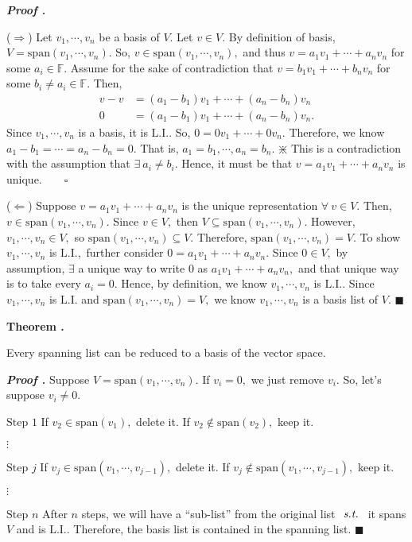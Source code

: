 \documentclass[11pt, letterpaper]{article}
\newcounter{index}[subsection]
\newenvironment*{thm}[1]{\begin{tcolorbox}\par\noindent\textbf{Theorem \thesubsection.\stepcounter{index}\theindex\ #1} \par}{\par\end{tcolorbox}}
\newcounter{nprf}[subsection]
\newenvironment*{prf}{\par\indent\textbf{\textit{Proof \stepcounter{nprf}\thenprf.}}}{\hfill$\blacksquare$\par}
\def\F{\mathbb{F}}
\def\st{\emph{ s.t. }}
\def\LI{\mathrm{L.I.}}
\def\span{\mathrm{span}}
\begin{document}
\begin{prf}
	\par ($\Rightarrow$) Let $v_1,\cdots,v_n$ be a basis of $V$. Let $v\in V.$ By definition of basis, $V=\span(v_1,\cdots,v_n).$ So, $v\in\span(v_1,\cdots,v_n),$ and thus $v=a_1v_1+\cdots+a_nv_n$ for some $a_i\in\F.$ Assume for the sake of contradiction that $v=b_1v_1+\cdots+b_nv_n$ for some $b_i\neq a_i\in\F.$ Then, \[\begin{aligned}v-v&=(a_1-b_1)v_1+\cdots+(a_n-b_n)v_n\\0&=(a_1-b_1)v_1+\cdots+(a_n-b_n)v_n.\end{aligned}\] Since $v_1,\cdots,v_n$ is a basis, it is $\LI.$ So, $0=0v_1+\cdots+0v_n.$ Therefore, we know $a_1-b_1=\cdots=a_n-b_n=0.$ That is, $a_1=b_1,\cdots,a_n=b_n.$ $\divideontimes$ This is a contradiction with the assumption that $\exists\ a_i\neq b_i.$ Hence, it must be that $v=a_1v_1+\cdots+a_nv_n$ is unique.$\qquad\square$\par 
	($\Leftarrow$) Suppose $v=a_1v_1+\cdots+a_nv_n$ is the unique representation $\forall\ v\in V.$ Then, $v\in\span(v_1,\cdots,v_n).$ Since $v\in V,$ then $V\subseteq\span(v_1,\cdots,v_n).$ However, $v_1,\cdots,v_n\in V,$ so $\span(v_1,\cdots,v_n)\subseteq V.$ Therefore, $\span(v_1,\cdots,v_n)=V.$ To show $v_1,\cdots,v_n$ is $\LI,$ further consider $0=a_1v_1+\cdots+a_nv_n.$ Since $0\in V,$ by assumption, $\exists$ a unique way to write $0$ as $a_1v_1+\cdots+a_nv_n,$ and that unique way is to take every $a_i=0.$ Hence, by definition, we know $v_1,\cdots,v_n$ is $\LI$. Since $v_1,\cdots,v_n$ is $\LI$ and $\span(v_1,\cdots,v_n)=V,$ we know $v_1,\cdots,v_n$ is a basis list of $V$.
\end{prf}
\begin{thm}{}
	Every spanning list can be reduced to a basis of the vector space. 	
\end{thm}
\begin{prf}
	Suppose $V=\span(v_1,\cdots,v_n).$ If $v_i=0,$ we just remove $v_i.$ So, let's suppose $v_i\neq0.$\par 
	$\boxed{\text{Step }1}$ If $v_2\in\span(v_1),$ delete it. If $v_2\notin\span(v_2),$ keep it.\par\indent\indent$\vdots$\par 
	$\boxed{\text{Step }j}$ If $v_j\in\span(v_1,\cdots,v_{j-1}),$ delete it. If $v_j\notin\span(v_1,\cdots,v_{j-1}),$ keep it.\par\indent\indent$\vdots$\par 
	$\boxed{\text{Step }n}$ After $n$ steps, we will have a ``sub-list'' from the original list $\st$ it spans $V$ and is $\LI.$ Therefore, the basis list is contained in the spanning list. 
\end{prf}
\end{document}
